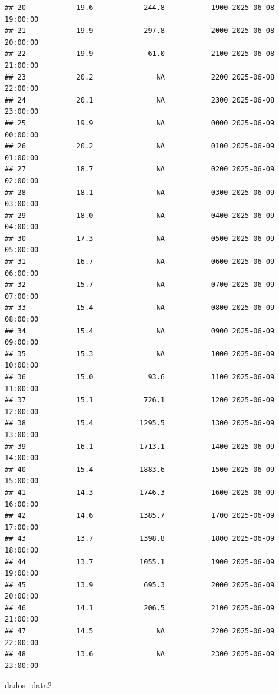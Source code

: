 \documentclass[
]{article}
\newenvironment{Shaded}{\begin{snugshade}}{\end{snugshade}}
\newcommand{\NormalTok}[1]{#1}
\begin{document}
\begin{verbatim}
## 20            19.6            244.8           1900 2025-06-08 19:00:00
## 21            19.9            297.8           2000 2025-06-08 20:00:00
## 22            19.9             61.0           2100 2025-06-08 21:00:00
## 23            20.2               NA           2200 2025-06-08 22:00:00
## 24            20.1               NA           2300 2025-06-08 23:00:00
## 25            19.9               NA           0000 2025-06-09 00:00:00
## 26            20.2               NA           0100 2025-06-09 01:00:00
## 27            18.7               NA           0200 2025-06-09 02:00:00
## 28            18.1               NA           0300 2025-06-09 03:00:00
## 29            18.0               NA           0400 2025-06-09 04:00:00
## 30            17.3               NA           0500 2025-06-09 05:00:00
## 31            16.7               NA           0600 2025-06-09 06:00:00
## 32            15.7               NA           0700 2025-06-09 07:00:00
## 33            15.4               NA           0800 2025-06-09 08:00:00
## 34            15.4               NA           0900 2025-06-09 09:00:00
## 35            15.3               NA           1000 2025-06-09 10:00:00
## 36            15.0             93.6           1100 2025-06-09 11:00:00
## 37            15.1            726.1           1200 2025-06-09 12:00:00
## 38            15.4           1295.5           1300 2025-06-09 13:00:00
## 39            16.1           1713.1           1400 2025-06-09 14:00:00
## 40            15.4           1883.6           1500 2025-06-09 15:00:00
## 41            14.3           1746.3           1600 2025-06-09 16:00:00
## 42            14.6           1385.7           1700 2025-06-09 17:00:00
## 43            13.7           1398.8           1800 2025-06-09 18:00:00
## 44            13.7           1055.1           1900 2025-06-09 19:00:00
## 45            13.9            695.3           2000 2025-06-09 20:00:00
## 46            14.1            206.5           2100 2025-06-09 21:00:00
## 47            14.5               NA           2200 2025-06-09 22:00:00
## 48            13.6               NA           2300 2025-06-09 23:00:00
\end{verbatim}

\begin{Shaded}
\begin{Highlighting}[]
\NormalTok{dados\_data2}
\end{Highlighting}
\end{Shaded}
\end{document}
